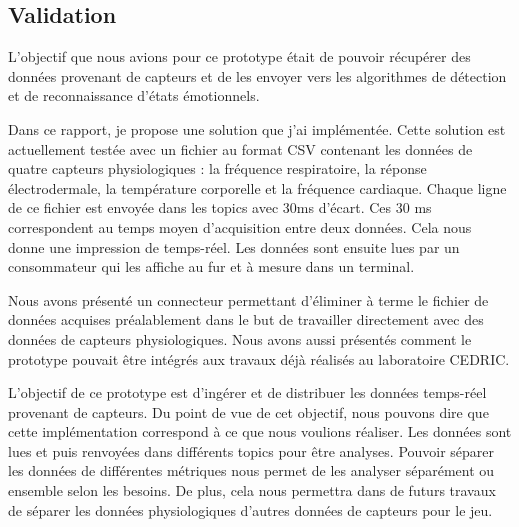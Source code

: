 \documentclass[11pt]{article}
\begin{document}
	\subsection{Validation}\label{sec:validation}
		L'objectif que nous avions pour ce prototype était de pouvoir récupérer des données provenant de capteurs et de les envoyer vers les algorithmes de détection et de reconnaissance d'états émotionnels.\par
		Dans ce rapport, je propose une solution que j'ai implémentée.
		Cette solution est actuellement testée avec un fichier au format CSV contenant les données de quatre capteurs physiologiques : la fréquence respiratoire, la réponse électrodermale, la température corporelle et la fréquence cardiaque. 
		Chaque ligne de ce fichier est envoyée dans les topics avec 30ms d'écart.
		Ces 30 ms correspondent au temps moyen d'acquisition entre deux données.
		Cela nous donne une impression de temps-réel. 
		Les données sont ensuite lues par un consommateur qui les affiche au fur et à mesure dans un terminal.\par
		Nous avons présenté un connecteur permettant d'éliminer à terme le fichier de données acquises préalablement dans le but de travailler directement avec des données de capteurs physiologiques.
		Nous avons aussi présentés comment le prototype pouvait être intégrés aux travaux déjà réalisés au laboratoire CEDRIC.\par
		L'objectif de ce prototype est d'ingérer et de distribuer les données temps-réel provenant de capteurs.
		Du point de vue de cet objectif, nous pouvons dire que cette implémentation correspond à ce que nous voulions réaliser.
		Les données sont lues et puis renvoyées dans différents topics pour être analyses.
		Pouvoir séparer les données de différentes métriques nous permet de les analyser séparément ou ensemble selon les besoins.
		De plus, cela nous permettra dans de futurs travaux de séparer les données physiologiques d'autres données de capteurs pour le jeu.\par
\end{document}
